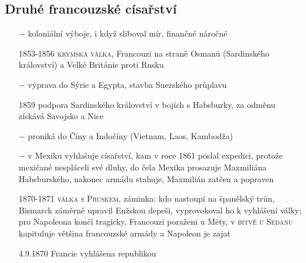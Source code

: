 \documentclass{article}
\begin{document}
\subsection*{Druhé francouzské císařství}
\begin{itemize}
    \vspace{-0.5em}
    \setlength\itemsep{0.15em}
    \item[$-$] koloniální výboje, i když sliboval mír, finančné náročné
    \item[1853-1856] \textsc{krymská válka}, Francouzi na straně Osmanů (Sardinského království) a Velké Británie proti Rusku
    \item[$-$] výprava do Sýrie a Egypta, stavba Suezského průplavu
    \item[1859] podpora Sardinského království v bojích s Habsburky, za odměnu získává Savojsko a Nice
    \item[$-$] proniká do Číny a Indočíny (Vietnam, Laos, Kambodža)
    \item[$-$] v Mexiku vyhlašuje císařství, kam v roce 1861 poslal expedici, protože mexičané nespláceli své dluhy, do čela Mexika prosazuje Maxmiliána Habsburského, nakonec armádu stahuje, Maxmilián zatčen a popraven
    \item[1870-1871] \textsc{válka s Pruskem}, záminka: kdo nastoupí na španělský trůn, Bismarck záměrně upravil Enžskou depeši, vyprovokoval ho k vyhlášení války; pro Napoleona končí tragicky, Francouzi poraženi u Méty, v \textsc{bitvě u Sedanu} kapituluje většina francouzské armády a Napoleon je zajat
    \item[4.9.1870] Francie vyhlášena republikou
\end{itemize}
\end{document}
